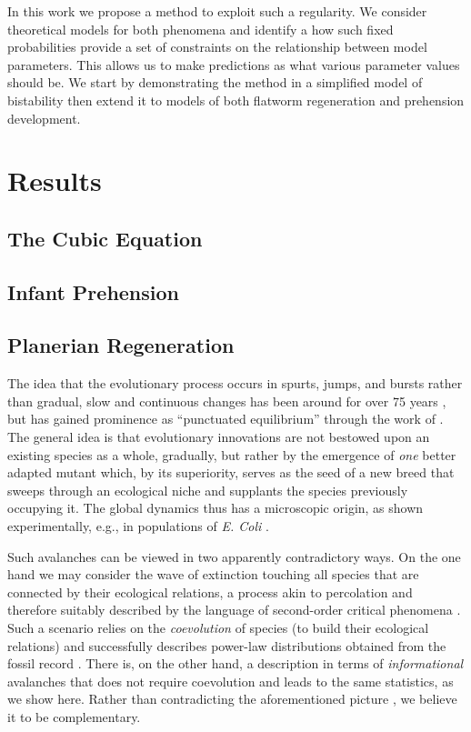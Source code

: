 \documentclass[letterpaper]{article}
\begin{document}
In this work we propose a method to exploit such a regularity. We consider
theoretical models for both phenomena and identify a how such fixed 
probabilities provide a set of constraints on the relationship between model
parameters. This allows us to make predictions as what various parameter 
values should be. We start by demonstrating the method in a simplified model
of bistability  then extend it to models of both flatworm regeneration and
prehension development.

\section{Results}
\subsection{The Cubic Equation}
\subsection{Infant Prehension}
\subsection{Planerian Regeneration}

The idea that the evolutionary process occurs in spurts, jumps, and
bursts rather than gradual, slow and continuous changes has been
around for over 75 years \citep{WIL}, but has gained prominence as
``punctuated equilibrium'' through the work of \citet{GE77,GE93}. The
general idea is that evolutionary innovations are not bestowed upon an
existing species as a whole, gradually, but rather by the emergence of
{\em one} better adapted mutant which, by its superiority, serves as
the seed of a new breed that sweeps through an ecological niche and
supplants the species previously occupying it. The global dynamics
thus has a microscopic origin, as shown experimentally, e.g., in
populations of {\it E. Coli} \citep{ECL96}.

Such avalanches can be viewed in two apparently contradictory ways. On
the one hand we may consider the wave of extinction touching all
species that are connected by their ecological relations, a process
akin to percolation and therefore suitably described by the language
of second-order critical phenomena \citep{BS}. Such a scenario relies
on the {\em coevolution} of species (to build their ecological
relations) and successfully describes power-law distributions obtained
from the fossil record \citep{SB96,BP96}. There is, on the other hand,
a description in terms of {\em informational} avalanches that does not
require coevolution and leads to the same statistics, as we show
here. Rather than contradicting the aforementioned picture
\citep{NFST}, we believe it to be complementary.
\end{document}
